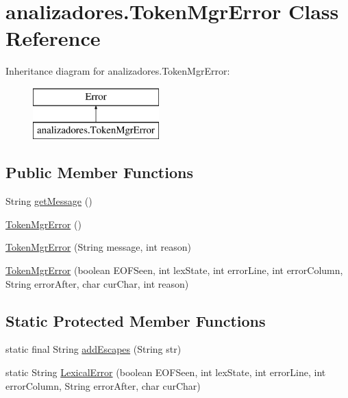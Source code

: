 \hypertarget{classanalizadores_1_1_token_mgr_error}{}\section{analizadores.\+Token\+Mgr\+Error Class Reference}
\label{classanalizadores_1_1_token_mgr_error}
Inheritance diagram for analizadores.\+Token\+Mgr\+Error\+:\begin{figure}[H]
\begin{center}
\leavevmode
\includegraphics[height=2.000000cm]{classanalizadores_1_1_token_mgr_error}
\end{center}
\end{figure}
\subsection*{Public Member Functions}
\begin{DoxyCompactItemize}
\item 
String \mbox{\hyperlink{classanalizadores_1_1_token_mgr_error_a2ca09b102b2298a30e610bff62937adb}{get\+Message}} ()
\item 
\mbox{\hyperlink{classanalizadores_1_1_token_mgr_error_aae12e4756c58ebb1213e7793357fd5c6}{Token\+Mgr\+Error}} ()
\item 
\mbox{\hyperlink{classanalizadores_1_1_token_mgr_error_ac36479183b0a3b39cd4415c340dce78a}{Token\+Mgr\+Error}} (String message, int reason)
\item 
\mbox{\hyperlink{classanalizadores_1_1_token_mgr_error_a085945c54985dd2a5c5281088d055e67}{Token\+Mgr\+Error}} (boolean E\+O\+F\+Seen, int lex\+State, int error\+Line, int error\+Column, String error\+After, char cur\+Char, int reason)
\end{DoxyCompactItemize}
\subsection*{Static Protected Member Functions}
\begin{DoxyCompactItemize}
\item 
static final String \mbox{\hyperlink{classanalizadores_1_1_token_mgr_error_a4d339ae7110c798549b2c27c2317bc0a}{add\+Escapes}} (String str)
\item 
static String \mbox{\hyperlink{classanalizadores_1_1_token_mgr_error_a4d3448e37bf6a5bcff202bd569fe0410}{Lexical\+Error}} (boolean E\+O\+F\+Seen, int lex\+State, int error\+Line, int error\+Column, String error\+After, char cur\+Char)
\end{DoxyCompactItemize}


